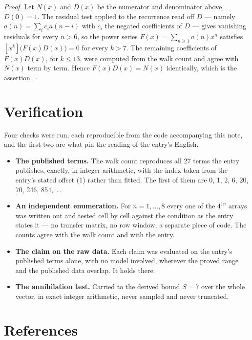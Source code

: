 \documentclass[11pt]{article}
\theoremstyle{definition}
\begin{document}
{\itshape Proof.} Let $N(x)$ and $D(x)$ be the numerator and denominator above, $D(0)=1$. The residual test applied to the recurrence read off $D$ --- namely $a(n) = \sum_i c_i a(n-i)$ with $c_i$ the negated coefficients of $D$ --- gives vanishing residuals for every $n > 6$, so the power series $F(x)=\sum_{n\ge 1}a(n)x^n$ satisfies $[x^k]\bigl(F(x)D(x)\bigr) = 0$ for every $k > 7$. The remaining coefficients of $F(x)D(x)$, for $k \le 13$, were computed from the walk count and agree with $N(x)$ term by term. Hence $F(x)D(x) = N(x)$ identically, which is the assertion. $\square$

\section{Verification}

Four checks were run, each reproducible from the code accompanying this note, and the first two are what pin the reading of the entry's English.

\begin{itemize}

\item {\bfseries The published terms.} The walk count reproduces all 27 terms the entry publishes, exactly, in integer arithmetic, with the index taken from the entry's stated offset (1) rather than fitted. The first of them are 0, 1, 2, 6, 20, 70, 246, 854,~\dots

\item {\bfseries An independent enumeration.} For $n = 1,\dots,8$ every one of the $4^{1n}$ arrays was written out and tested cell by cell against the condition as the entry states it --- no transfer matrix, no row window, a separate piece of code. The counts agree with the walk count and with the entry.

\item {\bfseries The claim on the raw data.} Each claim was evaluated on the entry's published terms alone, with no model involved, wherever the proved range and the published data overlap. It holds there.

\item {\bfseries The annihilation test.} Carried to the derived bound $S = 7$ over the whole vector, in exact integer arithmetic, never sampled and never truncated.

\end{itemize}

\section{References}
\end{document}
